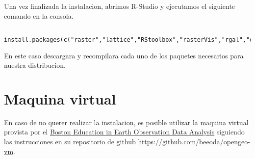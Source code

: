 Una vez finalizada la instalacion, abrimos R-Studio y ejecutamos el siguiente comando en la consola.

\begin{lstlisting}
  install.packages(c("raster","lattice","RStoolbox","rasterVis","rgal","e1071","randomForest","kernlab"))
\end{lstlisting}

En este caso descargara y recompilara cada uno de los paquetes necesarios para nuestra distribucion.

\section{Maquina virtual}

En caso de no querer realizar la instalacion, es posible utilizar la maquina virtual provista por el \href{www.beeoda.org}{Boston Education in Earth Observation Data Analysis} siguiendo las instrucciones en su repositorio de github \url{https://github.com/beeoda/opengeo-vm}.

